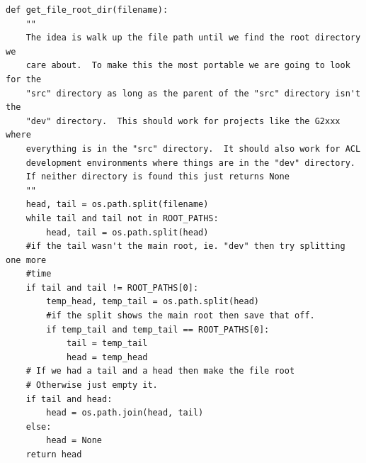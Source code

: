 \documentclass[11pt]{scrreprt}
\begin{document}
\begin{lstlisting}[frame=single,basicstyle=\small]
def get_file_root_dir(filename):
    ""
    The idea is walk up the file path until we find the root directory we
    care about.  To make this the most portable we are going to look for the
    "src" directory as long as the parent of the "src" directory isn't the
    "dev" directory.  This should work for projects like the G2xxx where
    everything is in the "src" directory.  It should also work for ACL
    development environments where things are in the "dev" directory.
    If neither directory is found this just returns None
    ""
    head, tail = os.path.split(filename)
    while tail and tail not in ROOT_PATHS:
        head, tail = os.path.split(head)
    #if the tail wasn't the main root, ie. "dev" then try splitting one more
    #time
    if tail and tail != ROOT_PATHS[0]:
        temp_head, temp_tail = os.path.split(head)
        #if the split shows the main root then save that off.
        if temp_tail and temp_tail == ROOT_PATHS[0]:
            tail = temp_tail
            head = temp_head
    # If we had a tail and a head then make the file root
    # Otherwise just empty it.
    if tail and head:
        head = os.path.join(head, tail)
    else:
        head = None
    return head

\end{lstlisting}
\end{document}
